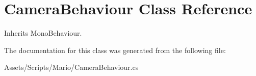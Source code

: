 \hypertarget{class_camera_behaviour}{\section{Camera\-Behaviour Class Reference}
\label{class_camera_behaviour}
}


Inherits Mono\-Behaviour.



The documentation for this class was generated from the following file\-:\begin{DoxyCompactItemize}
\item 
Assets/\-Scripts/\-Mario/Camera\-Behaviour.\-cs\end{DoxyCompactItemize}

